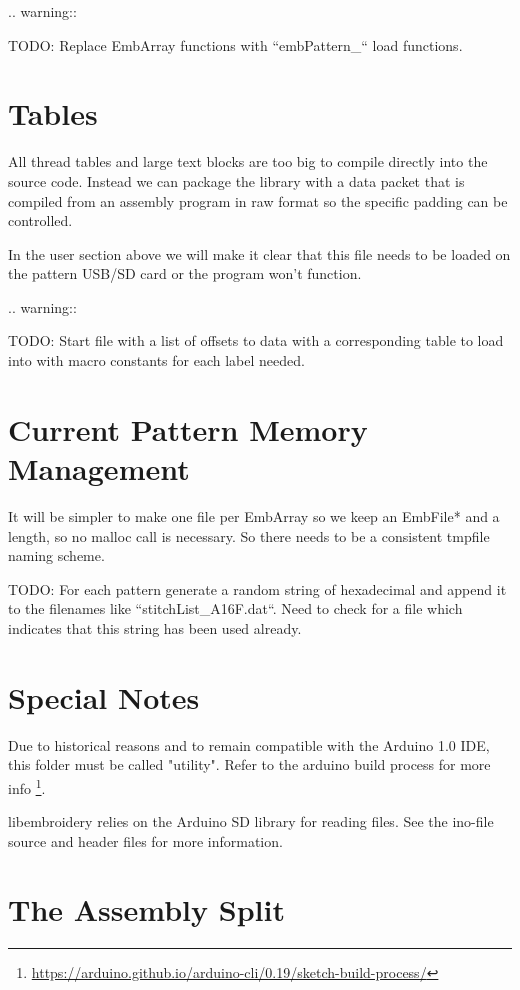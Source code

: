 \documentclass[10pt]{report}
\begin{document}
.. warning::

   TODO: Replace EmbArray functions with ``embPattern\_`` load functions.

\section{Tables}

All thread tables and large text blocks are too big to compile directly
into the source code. Instead we can package the library with a data packet
that is compiled from an assembly program in raw format so the specific
padding can be controlled.

In the user section above we will make it clear that this file
needs to be loaded on the pattern USB/SD card or the program won't function.

.. warning::

   TODO: Start file with a list of offsets to data with a corresponding table
   to load into with macro constants for each label needed.

\section{Current Pattern Memory Management}

It will be simpler to make one file per EmbArray so we keep an EmbFile*
and a length, so no malloc call is necessary. So there needs to be a consistent
tmpfile naming scheme.

TODO: For each pattern generate a random string of hexadecimal and append it
to the filenames like ``stitchList\_A16F.dat``. Need to check for a file
which indicates that this string has been used already.

\section{Special Notes}

Due to historical reasons and to remain compatible with the Arduino 1.0
IDE, this folder must be called "utility". Refer to the arduino build
process for more info
\footnote{\url{https://arduino.github.io/arduino-cli/0.19/sketch-build-process/}}.

libembroidery relies on the Arduino SD library for reading files. See
the ino-file source and header files for more information.

\section{The Assembly Split}
\end{document}
